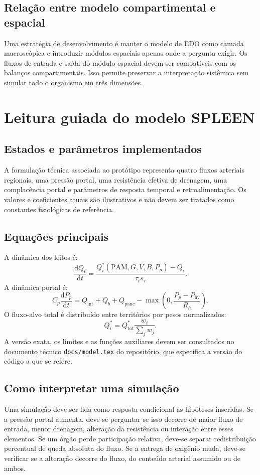 \documentclass[11pt,a4paper,oneside]{book}
\newcommand{\diff}[2]{\frac{\mathrm{d}#1}{\mathrm{d}#2}}
\newcommand{\MAP}{\mathrm{PAM}}
\begin{document}
\section{Relação entre modelo compartimental e espacial}
Uma estratégia de desenvolvimento é manter o modelo de EDO como camada macroscópica e introduzir módulos espaciais apenas onde a pergunta exigir. Os fluxos de entrada e saída do módulo espacial devem ser compatíveis com os balanços compartimentais. Isso permite preservar a interpretação sistêmica sem simular todo o organismo em três dimensões.

\chapter{Leitura guiada do modelo SPLEEN}

\section{Estados e parâmetros implementados}
A formulação técnica associada ao protótipo representa quatro fluxos arteriais regionais, uma pressão portal, uma resistência efetiva de drenagem, uma complacência portal e parâmetros de resposta temporal e retroalimentação. Os valores e coeficientes atuais são ilustrativos e não devem ser tratados como constantes fisiológicas de referência.

\section{Equações principais}
A dinâmica dos leitos é:
\begin{equation}
  \diff{Q_i}{t}=\frac{Q_i^*(\MAP,G,V,B,P_p)-Q_i}{\tau_i s_\tau}.
\end{equation}
A dinâmica portal é:
\begin{equation}
  C_p\diff{P_p}{t}=
  Q_{\mathrm{int}}+Q_b+Q_{\mathrm{panc}}
  -\max\left(0,\frac{P_p-P_{\mathrm{hv}}}{R_h}\right).
\end{equation}
O fluxo-alvo total é distribuído entre territórios por pesos normalizados:
\begin{equation}
  Q_i^*=Q_{\mathrm{tot}}^*\frac{w_i}{\sum_jw_j}.
\end{equation}
A versão exata, os limites e as funções auxiliares devem ser consultados no documento técnico \texttt{docs/model.tex} do repositório, que especifica a versão do código a que se refere.

\section{Como interpretar uma simulação}
Uma simulação deve ser lida como resposta condicional às hipóteses inseridas. Se a pressão portal aumenta, deve-se perguntar se isso decorre de maior fluxo de entrada, menor drenagem, alteração da resistência ou interação entre esses elementos. Se um órgão perde participação relativa, deve-se separar redistribuição percentual de queda absoluta do fluxo. Se a entrega de oxigênio muda, deve-se verificar se a alteração decorre do fluxo, do conteúdo arterial assumido ou de ambos.
\end{document}
